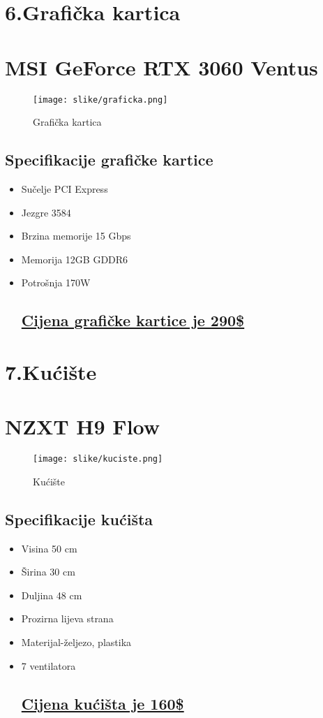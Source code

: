 \documentclass[12pt]{article}
\begin{document}
\newpage
\section*{\Huge 6.Grafička kartica}
\section*{\large MSI GeForce RTX 3060 Ventus}
\begin{figure}[h]
    \centering
    \texttt{[image: slike/graficka.png]} 
    \caption{Grafička kartica}
\end{figure}
\subsection*{Specifikacije grafičke kartice}
\begin{itemize}[label=--, left=0em]
    \item Sučelje PCI Express
    \item Jezgre 3584
    \item Brzina memorije 15 Gbps
    \item Memorija 12GB GDDR6
    \item Potrošnja 170W
\subsection*{\href{https://www.amazon.com/dp/B08WPRMVWB}{Cijena grafičke kartice je 290\$}}
\end{itemize}

\newpage
\section*{\Huge 7.Kućište}
\section*{\large NZXT H9 Flow}
\begin{figure}[h]
    \centering
    \texttt{[image: slike/kuciste.png]} 
    \caption{Kućište}
\end{figure}
\subsection*{Specifikacije kućišta}
\begin{itemize}[label=--, left=0em]
    \item Visina 50 cm
    \item Širina 30 cm
    \item Duljina 48 cm
    \item Prozirna lijeva strana
    \item Materijal-željezo, plastika
    \item 7 ventilatora
\subsection*{\href{https://www.amazon.com/dp/B0BFZZ3ZWZ}{Cijena kućišta je 160\$}}
\end{itemize}
\end{document}
